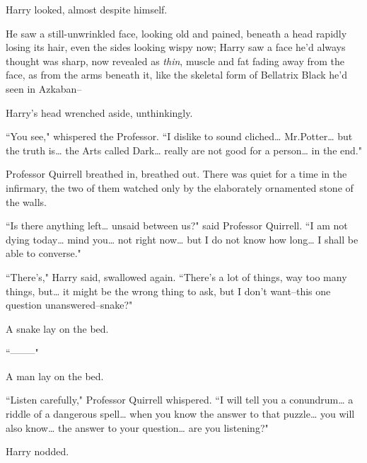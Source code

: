 Harry looked, almost despite himself.

He saw a still-unwrinkled face, looking old and pained, beneath a head rapidly losing its hair, even the sides looking wispy now; Harry saw a face he'd always thought was sharp, now revealed as \emph{thin}, muscle and fat fading away from the face, as from the arms beneath it, like the skeletal form of Bellatrix Black he'd seen in Azkaban\---

Harry's head wrenched aside, unthinkingly.

``You see," whispered the Professor. ``I dislike to sound cliched{\ldots} Mr.\?Potter{\ldots} but the truth is{\ldots} the Arts called Dark{\ldots} really are not good for a person{\ldots} in the end."

Professor Quirrell breathed in, breathed out. There was quiet for a time in the infirmary, the two of them watched only by the elaborately ornamented stone of the walls.

``Is there anything left{\ldots} unsaid between us?" said Professor Quirrell. ``I am not dying today{\ldots} mind you{\ldots} not right now{\ldots} but I do not know how long{\ldots} I shall be able to converse."

``There's," Harry said, swallowed again. ``There's a lot of things, way too many things, but{\ldots} it might be the wrong thing to ask, but I don't want\---this one question unanswered\---snake?"

A snake lay on the bed.

``\---\---\---\---\---"

A man lay on the bed.

``Listen carefully," Professor Quirrell whispered. ``I will tell you a conundrum{\ldots} a riddle of a dangerous spell{\ldots} when you know the answer to that puzzle{\ldots} you will also know{\ldots} the answer to your question{\ldots} are you listening?"

Harry nodded.

